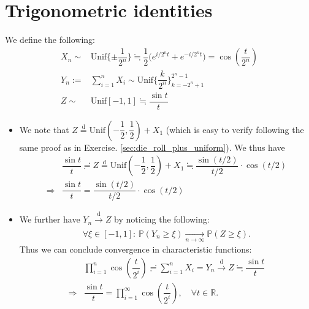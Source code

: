 \documentclass[11pt,a4paper]{article}
\numberwithin{equation}{section}%
\begin{document}
\section{Trigonometric identities}

We define the following:
\begin{align*}
    X_n\sim& \mathrm{ Unif }\{\pm \dfrac{ 1 }{ 2^n }\} \fallingdotseq \dfrac{ 1 }{ 2 }\big( e^{i/2^n t}+e^{-i/2^n t} \big)   =\cos(\dfrac{ t }{ 2^n })\\
    Y_n:=& \sum_{i=1}^n X_i \sim \mathrm{ Unif }\{ \dfrac{ k }{ 2^n }  \}_{k=-2^n+1}^{2^n-1}\\ 
    Z\sim & \mathrm{ Unif }[-1,1] \fallingdotseq \dfrac{ \sin t }{ t }
\end{align*}

\begin{itemize}[topsep=2pt,itemsep=0pt]
    \item We note that $ Z\mathop{ = }\limits^{\mathrm{ d } } \mathrm{ Unif }(-\dfrac{ 1 }{ 2 }, \dfrac{ 1 }{ 2 }  ) + X_1  $ (which is easy to verify following the same proof as in Exercise. \ref{sec:die_roll_plus_uniform}). We thus have
    \begin{align*}
        &\dfrac{ \sin t }{ t }\risingdotseq Z \mathop{ = }\limits^{\mathrm{ d } } \mathrm{ Unif }(-\dfrac{ 1 }{ 2 }, \dfrac{ 1 }{ 2 }  ) + X_1  \fallingdotseq \dfrac{ \sin(t/2) }{ t/2 } \cdot \cos(t/2) \\
         \Rightarrow & \dfrac{ \sin t }{ t }=\dfrac{ \sin(t/2) }{ t/2 } \cdot \cos(t/2) 
    \end{align*}
    \item We further have $ Y_n \xrightarrow[]{\mathrm{d}} Z $ by noticing the following:
    \begin{align*}
        \forall \xi \in [-1,1]:\,\mathbb{P}\left( Y_n \geq \xi  \right)  \mathop{ \rightarrow }\limits_{n\to\infty }\mathbb{P}\left( Z \geq \xi  \right)  .
    \end{align*}
    Thus we can conclude convergence in characteristic functions:
    \begin{align*}
        &\prod_{i=1}^n \cos(\dfrac{ t }{ 2^i })\risingdotseq \sum_{i=1}^n X_i = Y_n \xrightarrow[]{\mathrm{d}} Z \fallingdotseq \dfrac{ \sin t }{ t }\\
         \Rightarrow & \dfrac{ \sin t }{ t } = \prod_{i=1}^\infty \cos(\dfrac{ t }{ 2^i }),\quad \forall t\in \mathbb{R}.
    \end{align*}
\end{itemize}
\end{document}

